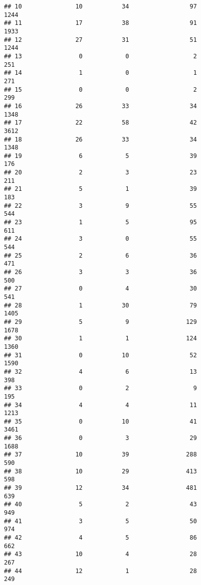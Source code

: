 \documentclass[12pt]{beamer}\usepackage[]{graphicx}\usepackage[]{color}
\makeatletter
\newenvironment{kframe}{%
 \def\at@end@of@kframe{}%
 \ifinner\ifhmode%
  \def\at@end@of@kframe{\end{minipage}}%
  \begin{minipage}{\columnwidth}%
 \fi\fi%
 \def\FrameCommand##1{\hskip\@totalleftmargin \hskip-\fboxsep
 \colorbox{shadecolor}{##1}\hskip-\fboxsep
     \hskip-\linewidth \hskip-\@totalleftmargin \hskip\columnwidth}%
 \MakeFramed {\advance\hsize-\width
   \@totalleftmargin\z@ \linewidth\hsize
   \@setminipage}}%
 {\par\unskip\endMakeFramed%
 \at@end@of@kframe}
\newenvironment{knitrout}{}{} %
\makeatother
\begin{document}
\begin{frame}[fragile]
\begin{knitrout}
\begin{kframe}
\begin{verbatim}
## 10               10           34                 97                1244
## 11               17           38                 91                1933
## 12               27           31                 51                1244
## 13                0            0                  2                 251
## 14                1            0                  1                 271
## 15                0            0                  2                 299
## 16               26           33                 34                1348
## 17               22           58                 42                3612
## 18               26           33                 34                1348
## 19                6            5                 39                 176
## 20                2            3                 23                 211
## 21                5            1                 39                 183
## 22                3            9                 55                 544
## 23                1            5                 95                 611
## 24                3            0                 55                 544
## 25                2            6                 36                 471
## 26                3            3                 36                 500
## 27                0            4                 30                 541
## 28                1           30                 79                1405
## 29                5            9                129                1678
## 30                1            1                124                1360
## 31                0           10                 52                1590
## 32                4            6                 13                 398
## 33                0            2                  9                 195
## 34                4            4                 11                1213
## 35                0           10                 41                3461
## 36                0            3                 29                1688
## 37               10           39                288                 590
## 38               10           29                413                 598
## 39               12           34                481                 639
## 40                5            2                 43                 949
## 41                3            5                 50                 974
## 42                4            5                 86                 662
## 43               10            4                 28                 267
## 44               12            1                 28                 249

\end{verbatim}
\end{kframe}
\end{knitrout}
\end{frame}
\end{document}
